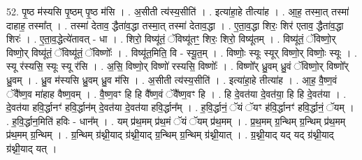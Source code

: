 \documentclass[17pt]{extarticle}
\begin{document}
52. पृ॒ष्ठ म॑स्यसि पृ॒ष्ठम् पृ॒ष्ठ म॑सि । . अ॒सीती त्य॑स्य॒सीति॑ । . इत्या॑हा॒हे तीत्या॑ह । . आ॒ह॒ तस्मा॒त् तस्मा॑ दाहाह॒ तस्मा᳚त् । . तस्मा॑ देताव॒ द्धैता॑व॒द्धा तस्मा॒त् तस्मा॑ देताव॒द्धा । . ए॒ता॒व॒द्धा शिरः॒ शिर॑ एताव॒ द्धैता॑व॒द्धा शिरः॑ । . ए॒ता॒व॒द्धेत्ये॑तावत् - धा । . शिरो॒ विष्यू॑तं॒ ॅविष्यू॑तꣳ॒॒ शिरः॒ शिरो॒ विष्यू॑तम् । . विष्यू॑तं॒ ॅविष्णो॒र् विष्णो॒र् विष्यू॑तं॒ ॅविष्यू॑तं॒ ॅविष्णोः᳚ । . विष्यू॑त॒मिति॒ वि - स्यू॒त॒म् । . विष्णोः॒ स्यूः स्यूर् विष्णो॒र् विष्णोः॒ स्यूः । . स्यू र॑स्यसि॒ स्यूः स्यू र॑सि । . अ॒सि॒ विष्णो॒र् विष्णो॑ रस्यसि॒ विष्णोः᳚ । . विष्णो᳚र् ध्रु॒वम् ध्रु॒वं ॅविष्णो॒र् विष्णो᳚र् ध्रु॒वम् । . ध्रु॒व म॑स्यसि ध्रु॒वम् ध्रु॒व म॑सि । . अ॒सीती त्य॑स्य॒सीति॑ । . इत्या॑हा॒हे तीत्या॑ह । . आ॒ह॒ वै॒ष्ण॒वं ॅवै᳚ष्ण॒व मा॑हाह वैष्ण॒वम् । . वै॒ष्ण॒वꣳ हि हि वै᳚ष्ण॒वं ॅवै᳚ष्ण॒वꣳ हि । . हि दे॒वत॑या दे॒वत॑या॒ हि हि दे॒वत॑या । . दे॒वत॑या हवि॒र्द्धानꣳ॑ हवि॒र्द्धान॑म् दे॒वत॑या दे॒वत॑या हवि॒र्द्धान᳚म् । . ह॒वि॒र्द्धानं॒ ॅयं ॅयꣳ ह॑वि॒र्द्धानꣳ॑ हवि॒र्द्धानं॒ ॅयम् । . ह॒वि॒र्द्धान॒मिति॑ हविः - धान᳚म् । . यम् प्र॑थ॒मम् प्र॑थ॒मं ॅयं ॅयम् प्र॑थ॒मम् । . प्र॒थ॒मम् ग्र॒न्थिम् ग्र॒न्थिम् प्र॑थ॒मम् प्र॑थ॒मम् ग्र॒न्थिम् । . ग्र॒न्थिम् ग्र॑थ्नी॒याद् ग्र॑थ्नी॒याद् ग्र॒न्थिम् ग्र॒न्थिम् ग्र॑थ्नी॒यात् । . ग्र॒थ्नी॒याद् यद् यद् ग्र॑थ्नी॒याद् ग्र॑थ्नी॒याद् यत् । \newline
\end{document}
